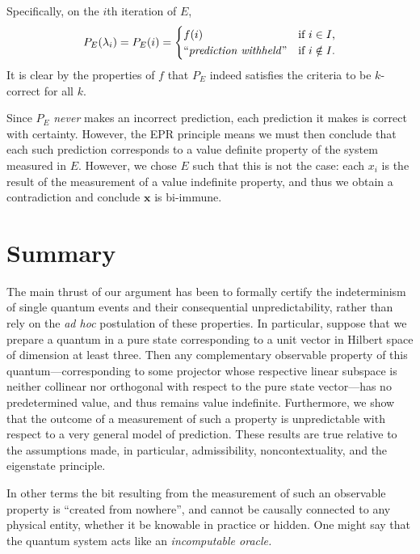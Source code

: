 \documentclass[%
 superscriptaddress,
 preprint,
 showpacs,
 showkeys,
 preprintnumbers,
  amsmath,amssymb,
  aps,
 pra,
  longbibliography,
  floatfix,
 ]{revtex4-1}
\theoremstyle{definition}
\newcommand{\x}{\mathbf{x}}
\begin{document}
Specifically, on the $i$th iteration of $E$, $$P_E(\lambda_i)=P_E(i)=\begin{cases}f(i) & \text{if $i\in I$,}\\\text{``\emph{prediction withheld}''} & \text{if $i\notin I$.}\end{cases}$$
It is clear by the properties of $f$ that $P_E$ indeed satisfies the criteria to be $k$-correct for all $k$.

Since $P_E$ \emph{never} makes an incorrect prediction, each prediction it makes is correct with certainty.
However, the EPR principle means we must then conclude that each such prediction corresponds to a value definite property of the system measured in $E$.
However, we chose $E$ such that this is not the case: each $x_i$ is the result of the measurement of a value indefinite property, and thus we obtain a contradiction and conclude $\x$ is bi-immune.
\fi


\section{Summary}

The main thrust of our argument has been to formally certify the indeterminism of single quantum events and their consequential unpredictability, rather than rely on the {\it ad hoc} postulation of these properties.
In particular, suppose that we prepare a quantum in a pure state corresponding %
to a unit vector in Hilbert space of dimension at least three. Then any complementary
observable property of this quantum---corresponding to some projector whose respective
linear subspace is neither collinear nor orthogonal with respect to the pure state vector---has no predetermined value, and thus remains value indefinite.
Furthermore, we show that the outcome of a measurement of such a property is unpredictable with respect to a very general model of prediction.
These results are true relative to the assumptions made,
in particular,
admissibility, noncontextuality, and the eigenstate principle.

In other terms the bit resulting from the measurement of such an observable property is ``created from nowhere'',
and cannot be causally connected to any physical entity, whether it be knowable in practice or hidden.
One might say that the quantum system acts like an {\em incomputable oracle.}
\end{document}
